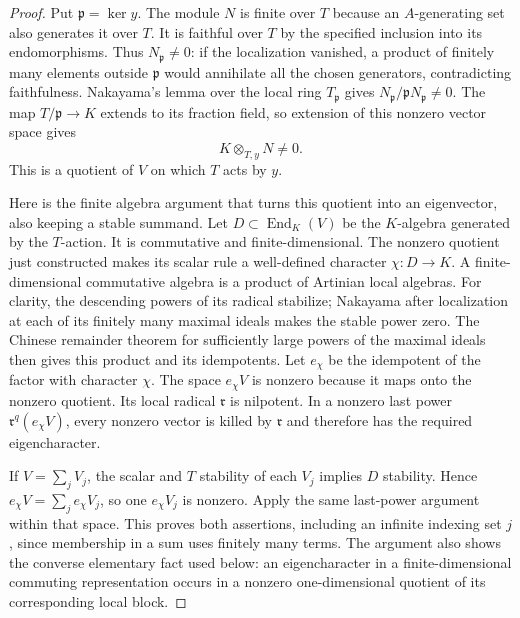\begin{proof}
Put $\mathfrak p=\ker y$.  The module $N$ is finite over $T$
because an $A$-generating set also generates it over $T$.
It is faithful over $T$ by the specified inclusion into its
endomorphisms.  Thus $N_{\mathfrak p}\ne0$: if the localization
vanished, a product of finitely many elements outside
$\mathfrak p$ would annihilate all the chosen generators,
contradicting faithfulness.  Nakayama's lemma over the local
ring $T_{\mathfrak p}$ gives
$N_{\mathfrak p}/\mathfrak pN_{\mathfrak p}\ne0$.
The map $T/\mathfrak p\to K$ extends to its fraction field,
so extension of this nonzero vector space gives
\[
       K\otimes_{T,y}N\ne0.
\]
This is a quotient of $V$ on which $T$ acts by $y$.

Here is the finite algebra argument that turns this quotient
into an eigenvector, also keeping a stable summand.  Let
$D\subset\operatorname{End}_K(V)$ be the $K$-algebra generated
by the $T$-action.  It is commutative and finite-dimensional.
The nonzero quotient just constructed makes its scalar rule
a well-defined character $\chi:D\to K$.  A finite-dimensional
commutative algebra is a product of Artinian local algebras.
For clarity, the descending powers of its radical stabilize;
Nakayama after localization at each of its finitely many
maximal ideals makes the stable power zero.  The Chinese
remainder theorem for sufficiently large powers of the
maximal ideals then gives this product and its idempotents.
Let $e_\chi$ be the idempotent of the factor with character
$\chi$.  The space $e_\chi V$ is nonzero because it maps
onto the nonzero quotient.  Its local radical $\mathfrak r$
is nilpotent.  In a nonzero last power
$\mathfrak r^q(e_\chi V)$, every nonzero vector is killed by
$\mathfrak r$ and therefore has the required eigencharacter.

If $V=\sum_jV_j$, the scalar and $T$ stability of each $V_j$
implies $D$ stability.  Hence
$e_\chi V=\sum_je_\chi V_j$, so one $e_\chi V_j$ is nonzero.
Apply the same last-power argument within that space.
This proves both assertions, including an infinite indexing
set $j$, since membership in a sum uses finitely many terms.
The argument also shows the converse elementary fact used
below: an eigencharacter in a finite-dimensional commuting
representation occurs in a nonzero one-dimensional quotient
of its corresponding local block.
\end{proof}

